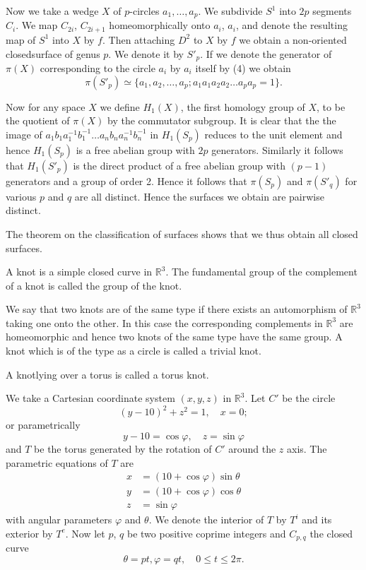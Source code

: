 Now we take a wedge $X$ of $p$-circles $a_1, \ldots, a_p$. We
subdivide $S^1$ into $2p$ segments $C_i$. We map $C_{2i}$, $C_{2i+1}$
homeomorphically onto $a_i$, $a_i$, and denote the resulting map of
$S^1$ into $X$ by $f$. Then attaching $D^2$ to $X$ by $f$ we obtain a
non-oriented closed\pageoriginale surface of genus $p$. We denote it
by $S'_p$. If we denote the generator of $\pi(X)$ corresponding to
the circle $a_i$ by $a_i$ itself by (4) we obtain  
$$
\pi (S'_p) \simeq \{ a_1, a_2, \ldots, a_p; a_1 a_1 a_2 a_2 \ldots
a_p a_p = 1 \}. 
$$

Now for any space $X$ we define $H_1(X)$, the first homology group of
$X$, to be the quotient of $\pi(X)$ by the commutator subgroup. It
is clear that the the image of $a_1 b_1 a^{-1}_1 b^{-1}_1 \ldots a_n
b_n a^{-1}_n b^{-1}_n$ in $H_1(S_p)$ reduces to the unit element and
hence $H_1(S_p)$ is a free abelian group with $2p$
generators. Similarly it follows that $H_1({S'}_p)$ is the direct
product of a free abelian group with $(p-1)$ generators and a group of
order 2. Hence it follows that $\pi (S_p)$ and $\pi (S'_q)$ for
various $p$ and $q$ are all distinct. Hence the surfaces we obtain are
pairwise distinct. 

The theorem on the classification of surfaces shows that we thus 
obtain all closed surfaces. 

\medskip
{}

A knot is a simple closed curve in $\mathbb{R}^3$. The fundamental
group of the complement of a knot is called the group of the knot. 
 
We say that two knots are of the same type if there exists an
automorphism of $\mathbb{R}^3$ taking one onto the other. In this case
the corresponding complements in $\mathbb{R}^3$ are homeomorphic and
hence two knots of the same type have the same group. A knot which is
of the type as a circle is called a trivial knot. 

A knot\pageoriginale lying over a torus is called a torus knot.

We take a Cartesian coordinate system $(x, y, z)$ in
$\mathbb{R}^3$. Let $C'$ be the circle  
$$
(y - 10)^2 + z^2 = 1, \quad x = 0; 
$$
or parametrically 
$$
y-10 = \cos \varphi, \quad z = \sin \varphi 
$$
and $T$ be the torus generated by the rotation of $C'$ around the $z$
axis. The parametric equations of $T$ are  
\begin{align*}
x & = (10 + \cos \varphi) \sin \theta\\
y & = (10 + \cos \varphi) \cos \theta\\
z & = \sin \varphi
\end{align*} 
with angular parameters $\varphi$ and $\theta$. We denote the interior
of $T$ by $T^i$ and its exterior by $T^e$. Now let $p$, $q$ be two
positive coprime integers and $C_{p,q}$ the closed curve 
$$
\theta = pt, \varphi = qt,  \quad 0 \leq t \leq 2 \pi.
$$

